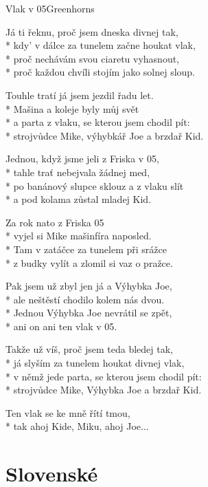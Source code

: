\documentclass[10.5pt]{book}
\begin{document}
\begin{poem}{Vlak v 05}{Greenhorns}

\settowidth{\versewidth}{v němž jede parta, se kterou jsem chodil pít:}

Já ti řeknu, proč jsem dneska divnej tak,\\*
kdy' v dálce za tunelem začne houkat vlak,\\*
proč nechávám svou ciaretu vyhasnout,\\*
proč každou chvíli stojím jako solnej sloup.

Touhle tratí já jsem jezdil řadu let.\\*
Mašina a koleje byly můj svět\\*
a parta z vlaku, se kterou jsem chodil pít:\\*
strojvůdce Mike, výhybkář Joe a brzdař Kid.

Jednou, když jsme jeli z Friska v 05,\\*
tahle trať nebejvala žádnej med,\\*
po banánový slupce sklouz a z vlaku slít\\*
a pod kolama zůstal mladej Kid.

Za rok nato z Friska 05\\*
vyjel si Mike mašinfíra naposled.\\*
Tam v zatáčce za tunelem při srážce\\*
z budky vylít a zlomil si vaz o pražce.

Pak jsem už zbyl jen já a Výhybka Joe,\\*
ale neštěstí chodilo kolem nás dvou.\\*
Jednou Výhybka Joe nevrátil se zpět,\\*
ani on ani ten vlak v 05.

Takže už víš, proč jsem teda bledej tak,\\*
já slyším za tunelem houkat divnej vlak,\\*
v němž jede parta, se kterou jsem chodil pít:\\*
strojvůdce Mike, Výhybka Joe a brzdař Kid.

Ten vlak se ke mně řítí tmou,\\*
tak ahoj Kide, Miku, ahoj Joe...

\end{poem}


\section{Slovenské}
\end{document}
